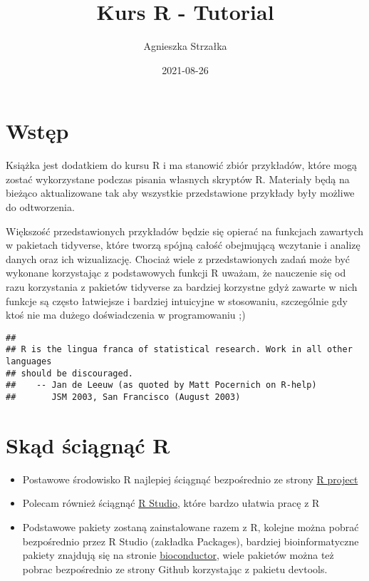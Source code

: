 \documentclass[
]{book}
\title{Kurs R - Tutorial}
\author{Agnieszka Strzałka}
\date{2021-08-26}
\providecommand{\tightlist}{%
  \setlength{\itemsep}{0pt}\setlength{\parskip}{0pt}}
\begin{document}
\maketitle

{
\setcounter{tocdepth}{1}
\tableofcontents
}
\hypertarget{wstux119p}{%
\chapter{Wstęp}\label{wstux119p}}

Książka jest dodatkiem do kursu R i ma stanowić zbiór przykładów, które mogą zostać wykorzystane podczas pisania własnych skryptów R. Materiały będą na bieżąco aktualizowane tak aby wszystkie przedstawione przykłady były możliwe do odtworzenia.

Większość przedstawionych przykładów będzie się opierać na funkcjach zawartych w pakietach tidyverse, które tworzą spójną całość obejmującą wczytanie i analizę danych oraz ich wizualizację. Chociaż wiele z przedstawionych zadań może być wykonane korzystając z podstawowych funkcji R uważam, że nauczenie się od razu korzystania z pakietów tidyverse za bardziej korzystne gdyż zawarte w nich funkcje są często łatwiejsze i bardziej intuicyjne w stosowaniu, szczególnie gdy ktoś nie ma dużego doświadczenia w programowaniu ;)

\begin{verbatim}
## 
## R is the lingua franca of statistical research. Work in all other languages
## should be discouraged.
##    -- Jan de Leeuw (as quoted by Matt Pocernich on R-help)
##       JSM 2003, San Francisco (August 2003)
\end{verbatim}

\hypertarget{skux105d-ux15bciux105gnux105ux107-r}{%
\chapter{Skąd ściągnąć R}\label{skux105d-ux15bciux105gnux105ux107-r}}

\begin{itemize}
\tightlist
\item
  Postawowe środowisko R najlepiej ściągnąć bezpośrednio ze strony \href{http://www.r-project.org/}{R project}
\item
  Polecam również ściągnąć \href{http://www.rstudio.com/}{R Studio}, które bardzo ułatwia pracę z R
\item
  Podstawowe pakiety zostaną zainstalowane razem z R, kolejne można pobrać bezpośrednio przez R Studio (zakładka Packages), bardziej bioinformatyczne pakiety znajdują się na stronie \href{http://www.bioconductor.org/}{bioconductor},
  wiele pakietów można też pobrac bezpośrednio ze strony Github korzystając z pakietu devtools.
\end{itemize}
\end{document}
